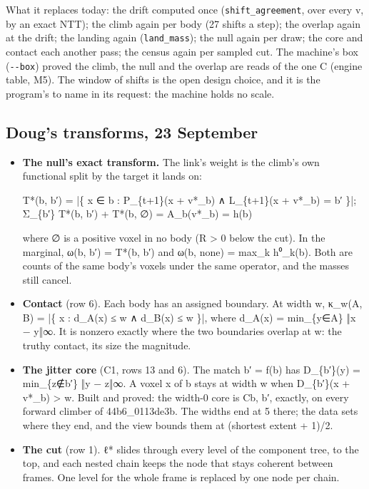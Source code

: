 What it replaces today: the drift computed once (\texttt{shift\_\allowbreak{}agreement}, over every v, by an exact NTT); the climb again per body (27 shifts a step); the overlap again at the drift; the landing again (\texttt{land\_\allowbreak{}mass}); the null again per draw; the core and contact each another pass; the census again per sampled cut. The machine's box (\texttt{-\allowbreak{}-\allowbreak{}box}) proved the climb, the null and the overlap are reads of the one C (engine table, M5). The window of shifts is the open design choice, and it is the program's to name in its request: the machine holds no scale.

\subsection{\texorpdfstring{Doug's transforms, 23 September}{Doug's transforms, 23 September}}

\begin{itemize}
\item \textbf{The null's exact transform.} The link's weight is the climb's own functional split by the target it lands on:

T*(b, b′) = |\{ x ∈ b : P\_\allowbreak{}\{t+1\}(x + v*\_\allowbreak{}b) ∧ L\_\allowbreak{}\{t+1\}(x + v*\_\allowbreak{}b) = b′ \}|;  Σ\_\allowbreak{}\{b′\} T*(b, b′) + T*(b, ∅) = A\_\allowbreak{}b(v*\_\allowbreak{}b) = h(b)

where ∅ is a positive voxel in no body (R > 0 below the cut). In the marginal, ω(b, b′) = T*(b, b′) and ω(b, none) = max\_\allowbreak{}k h⁰\_\allowbreak{}k(b). Both are counts of the same body's voxels under the same operator, and the masses still cancel.
\item \textbf{Contact} (row 6). Each body has an assigned boundary. At width w, κ\_\allowbreak{}w(A, B) = |\{ x : d\_\allowbreak{}A(x) ≤ w ∧ d\_\allowbreak{}B(x) ≤ w \}|, where d\_\allowbreak{}A(x) = min\_\allowbreak{}\{y∈A\} ‖x − y‖∞. It is nonzero exactly where the two boundaries overlap at w: the truthy contact, its size the magnitude.
\item \textbf{The jitter core} (C1, rows 13 and 6). The match b′ = f(b) has D\_\allowbreak{}\{b′\}(y) = min\_\allowbreak{}\{z∉b′\} ‖y − z‖∞. A voxel x of b stays at width w when D\_\allowbreak{}\{b′\}(x + v*\_\allowbreak{}b) > w. Built and proved: the width-0 core is Cb, b′, exactly, on every forward climber of 44b6\_\allowbreak{}0113de3b. The widths end at 5 there; the data sets where they end, and the view bounds them at (shortest extent + 1)/2.
\item \textbf{The cut} (row 1). ℓ* slides through every level of the component tree, to the top, and each nested chain keeps the node that stays coherent between frames. One level for the whole frame is replaced by one node per chain.
\end{itemize}


